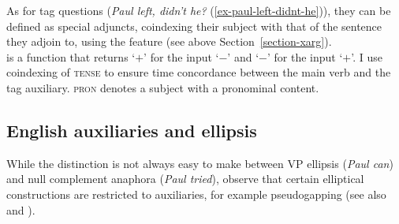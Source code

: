 \eal
{}
\zl

As for tag questions (\emph{Paul left, didn't he?} (\ref{ex-paul-left-didnt-he})), they can be defined as special adjuncts, coindexing their subject with that of the sentence they adjoin to, using the \xarg feature (see above Section~\ref{section-xarg}).
\ea
{} \impl\\
\z
{} is a function that returns `$+$' for the input `$-$' and `$-$' for the input `$+$'. I use coindexing of \textsc{tense} to ensure time concordance between the main verb and the tag auxiliary. \textsc{pron} denotes a subject with a pronominal content.

\subsection{English auxiliaries and ellipsis}

While the distinction is not always easy to make between VP ellipsis (\emph{Paul can}) and null complement anaphora
(\emph{Paul tried}), \citeauthor{Sagetal2020} observe that certain elliptical constructions are
restricted to auxiliaries, for example pseudogapping (see also
 and
\citealt{Miller2014a-u}).

\eal
{}
\zl

